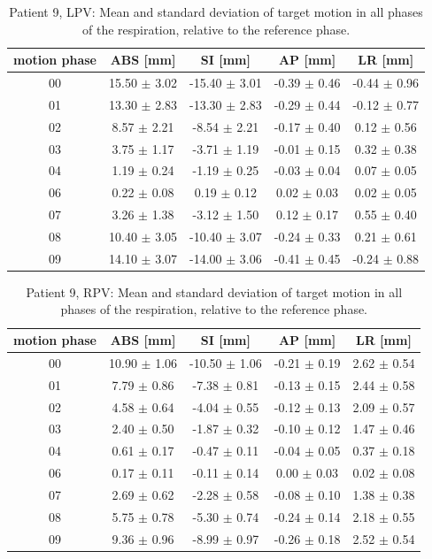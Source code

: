 \documentclass[type=dr, dr=rernat, accentcolor=tud7b,colorbacktitle, bigchapter, openright, twoside, 12pt ]{tudthesis}
\begin{document}

\begin{table}[H]
  \centering
  \caption{Patient 9, LPV: Mean and standard deviation of target motion in all phases of the respiration, relative to the reference phase.}
  \begin{tabular}{|c|c|c|c|c|}
    \hline\hline
    motion phase & ABS [mm] & SI [mm] & AP [mm] & LR [mm]\\
    \hline 
00& 15.50 $\pm$ 3.02& -15.40 $\pm$ 3.01& -0.39 $\pm$ 0.46& -0.44 $\pm$ 0.96 \\
01& 13.30 $\pm$ 2.83& -13.30 $\pm$ 2.83& -0.29 $\pm$ 0.44& -0.12 $\pm$ 0.77 \\
02& 8.57 $\pm$ 2.21& -8.54 $\pm$ 2.21& -0.17 $\pm$ 0.40& 0.12 $\pm$ 0.56 \\
03& 3.75 $\pm$ 1.17& -3.71 $\pm$ 1.19& -0.01 $\pm$ 0.15& 0.32 $\pm$ 0.38 \\
04& 1.19 $\pm$ 0.24& -1.19 $\pm$ 0.25& -0.03 $\pm$ 0.04& 0.07 $\pm$ 0.05 \\
06& 0.22 $\pm$ 0.08& 0.19 $\pm$ 0.12& 0.02 $\pm$ 0.03& 0.02 $\pm$ 0.05 \\
07& 3.26 $\pm$ 1.38& -3.12 $\pm$ 1.50& 0.12 $\pm$ 0.17& 0.55 $\pm$ 0.40 \\
08& 10.40 $\pm$ 3.05& -10.40 $\pm$ 3.07& -0.24 $\pm$ 0.33& 0.21 $\pm$ 0.61 \\ 
09& 14.10 $\pm$ 3.07& -14.00 $\pm$ 3.06& -0.41 $\pm$ 0.45& -0.24 $\pm$ 0.88 \\
        \hline\hline
  \end{tabular}
\end{table}

\begin{table}[H]
  \centering
  \caption{Patient 9, RPV: Mean and standard deviation of target motion in all phases of the respiration, relative to the reference phase.}
  \begin{tabular}{|c|c|c|c|c|}
    \hline\hline
    motion phase & ABS [mm] & SI [mm] & AP [mm] & LR [mm]\\
    \hline 
00& 10.90 $\pm$ 1.06& -10.50 $\pm$ 1.06& -0.21 $\pm$ 0.19& 2.62 $\pm$ 0.54 \\
01& 7.79 $\pm$ 0.86& -7.38 $\pm$ 0.81& -0.13 $\pm$ 0.15& 2.44 $\pm$ 0.58 \\
02& 4.58 $\pm$ 0.64& -4.04 $\pm$ 0.55& -0.12 $\pm$ 0.13& 2.09 $\pm$ 0.57 \\
03& 2.40 $\pm$ 0.50& -1.87 $\pm$ 0.32& -0.10 $\pm$ 0.12& 1.47 $\pm$ 0.46 \\
04& 0.61 $\pm$ 0.17& -0.47 $\pm$ 0.11& -0.04 $\pm$ 0.05& 0.37 $\pm$ 0.18 \\
06& 0.17 $\pm$ 0.11& -0.11 $\pm$ 0.14& 0.00 $\pm$ 0.03& 0.02 $\pm$ 0.08 \\
07& 2.69 $\pm$ 0.62& -2.28 $\pm$ 0.58& -0.08 $\pm$ 0.10& 1.38 $\pm$ 0.38 \\
08& 5.75 $\pm$ 0.78& -5.30 $\pm$ 0.74& -0.24 $\pm$ 0.14& 2.18 $\pm$ 0.55 \\
09& 9.36 $\pm$ 0.96& -8.99 $\pm$ 0.97& -0.26 $\pm$ 0.18& 2.52 $\pm$ 0.54 \\
        \hline\hline
  \end{tabular}
\end{table}
\end{document}
